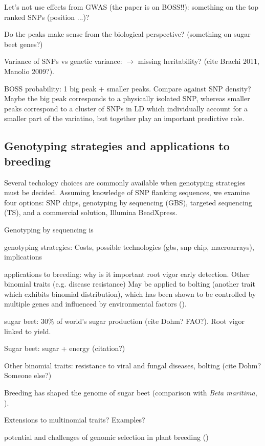 Let's not use effects from GWAS (the paper is on BOSS!!): something on
the top ranked SNPs (position ...)?

Do the peaks make sense from the biological perspective? (something on
sugar beet genes?)

Variance of SNPs vs genetic variance: $\rightarrow$ missing
heritability? (cite Brachi 2011, Manolio 2009?).

BOSS probability: 1 big peak + smaller peaks. Compare against SNP
density? Maybe the big peak corresponds to a physically isolated SNP,
whereas smaller peaks correspond to a cluster of SNPs in LD which
individually account for a smaller part of the variatino, but together
play an important predictive role. 


\subsection{Genotyping strategies and applications to breeding}
Several techology choices are commonly available when genotyping strategies
must be decided. Assuming knowledge of SNP flanking sequences, we examine
four options: SNP chips, genotyping by sequencing (GBS), targeted sequencing (TS),
and a commercial solution, Illumina BeadXpress.


Genotyping by sequencing is 

genotyping strategies: 
Costs, possible technologies (gbs, snp chip, macroarrays), implications

applications to breeding:
why is it important root vigor early detection. Other binomial traits (e.g.
disease resistance) May be applied to bolting (another trait which
exhibits binomial distribution), which has been shown to be controlled
by multiple genes and influenced by environmental factors
(\cite{salah2012genetic}).

sugar beet: $30\%$ of world's sugar production (cite Dohm? FAO?). Root
vigor linked to yield.

Sugar beet: sugar + energy (citation?)

Other binomial traits: resistance to viral and fungal diseases, bolting
(cite Dohm? Someone else?)

Breeding has shaped the genome of sugar beet (comparison with \emph{Beta
  maritima}, \cite{dohm2013genome}).

Extensions to multinomial traits? Examples?

potential and challenges of genomic selection in plant breeding (\cite{jonas2013does})


